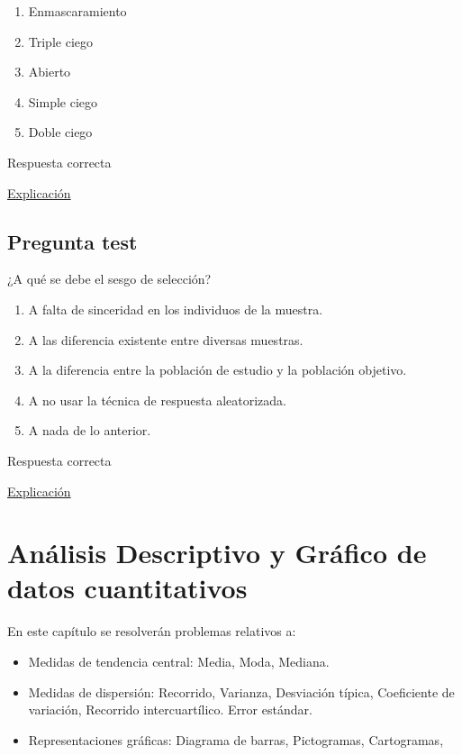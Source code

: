 \documentclass[
]{book}
\providecommand{\tightlist}{%
  \setlength{\itemsep}{0pt}\setlength{\parskip}{0pt}}
\begin{document}
\begin{enumerate}
\def\labelenumi{\alph{enumi})}
\tightlist
\item
  Enmascaramiento
\item
  Triple ciego
\item
  Abierto
\item
  Simple ciego
\item
  Doble ciego
\end{enumerate}

Respuesta correcta

\href{http://cv.uoc.edu/UOC/a/moduls/90/90_166d/web/main/m4/22d.html}{Explicación}

\hypertarget{pregunta-test-49}{%
\section{Pregunta test}\label{pregunta-test-49}}

¿A qué se debe el sesgo de selección?

\begin{enumerate}
\def\labelenumi{\alph{enumi})}
\tightlist
\item
  A falta de sinceridad en los individuos de la muestra.
\item
  A las diferencia existente entre diversas muestras.
\item
  A la diferencia entre la población de estudio y la población objetivo.
\item
  A no usar la técnica de respuesta aleatorizada.
\item
  A nada de lo anterior.
\end{enumerate}

Respuesta correcta

\href{https://es.wikipedia.org/wiki/Sesgo_de_selección}{Explicación}

\hypertarget{anuxe1lisis-descriptivo-y-gruxe1fico-de-datos-cuantitativos}{%
\chapter{Análisis Descriptivo y Gráfico de datos cuantitativos}\label{anuxe1lisis-descriptivo-y-gruxe1fico-de-datos-cuantitativos}}

En este capítulo se resolverán problemas relativos a:

\begin{itemize}
\tightlist
\item
  Medidas de tendencia central: Media, Moda, Mediana.
\item
  Medidas de dispersión: Recorrido, Varianza, Desviación típica, Coeficiente de variación, Recorrido intercuartílico. Error estándar.
\item
  Representaciones gráficas: Diagrama de barras, Pictogramas, Cartogramas,
\end{itemize}
\end{document}
